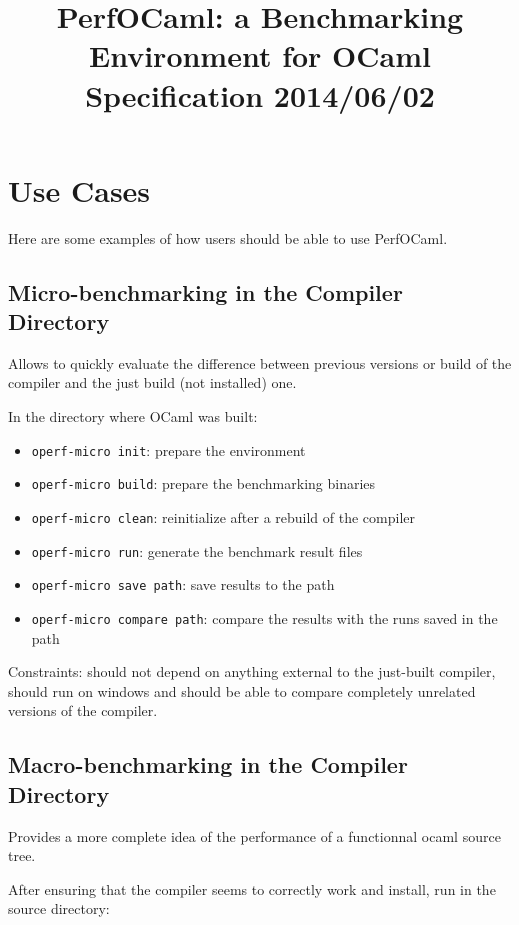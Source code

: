 \documentclass[11pt,a4paper]{article}
\begin{document}
\title{PerfOCaml: a Benchmarking Environment for OCaml\\Specification 2014/06/02}

\maketitle
\tableofcontents
\section{Use Cases}

Here are some examples of how users should be able to use PerfOCaml.

\subsection{Micro-benchmarking in the Compiler Directory}

Allows to quickly evaluate the difference between previous versions or
build of the compiler and the just build (not installed) one.

In the directory where OCaml was built:
\begin{itemize}
\item {\tt operf-micro init}: prepare the environment
\item {\tt operf-micro build}: prepare the benchmarking binaries
\item {\tt operf-micro clean}: reinitialize after a rebuild of the compiler
\item {\tt operf-micro run}: generate the benchmark result files
\item {\tt operf-micro save path}: save results to the path
\item {\tt operf-micro compare path}: compare the results with the runs saved in the path
\end{itemize}

Constraints: should not depend on anything external to the just-built
compiler, should run on windows and should be able to compare
completely unrelated versions of the compiler.

\subsection{Macro-benchmarking in the Compiler Directory}

Provides a more complete idea of the performance of a functionnal
ocaml source tree.

After ensuring that the compiler seems to correctly work and install,
run in the source directory:
\end{document}
